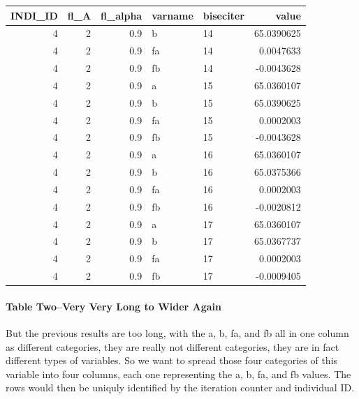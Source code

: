\documentclass[
]{book}
\begin{document}
\begin{table}[!h]
\centering
\begin{tabular}{r|r|r|l|l|r}
\hline
INDI\_ID & fl\_A & fl\_alpha & varname & biseciter & value\\
\hline
\rowcolor{gray!6}  4 & 2 & 0.9 & b & 14 & 65.0390625\\
\hline
4 & 2 & 0.9 & fa & 14 & 0.0047633\\
\hline
\rowcolor{gray!6}  4 & 2 & 0.9 & fb & 14 & -0.0043628\\
\hline
4 & 2 & 0.9 & a & 15 & 65.0360107\\
\hline
\rowcolor{gray!6}  4 & 2 & 0.9 & b & 15 & 65.0390625\\
\hline
4 & 2 & 0.9 & fa & 15 & 0.0002003\\
\hline
\rowcolor{gray!6}  4 & 2 & 0.9 & fb & 15 & -0.0043628\\
\hline
4 & 2 & 0.9 & a & 16 & 65.0360107\\
\hline
\rowcolor{gray!6}  4 & 2 & 0.9 & b & 16 & 65.0375366\\
\hline
4 & 2 & 0.9 & fa & 16 & 0.0002003\\
\hline
\rowcolor{gray!6}  4 & 2 & 0.9 & fb & 16 & -0.0020812\\
\hline
4 & 2 & 0.9 & a & 17 & 65.0360107\\
\hline
\rowcolor{gray!6}  4 & 2 & 0.9 & b & 17 & 65.0367737\\
\hline
4 & 2 & 0.9 & fa & 17 & 0.0002003\\
\hline
\rowcolor{gray!6}  4 & 2 & 0.9 & fb & 17 & -0.0009405\\
\hline
\end{tabular}
\end{table}

\hypertarget{table-twovery-very-long-to-wider-again}{%
\paragraph{Table Two--Very Very Long to Wider Again}\label{table-twovery-very-long-to-wider-again}}

But the previous results are too long, with the a, b, fa, and fb all in one column as different categories, they are really not different categories, they are in fact different types of variables. So we want to spread those four categories of this variable into four columns, each one representing the a, b, fa, and fb values. The rows would then be uniquly identified by the iteration counter and individual ID.
\end{document}
